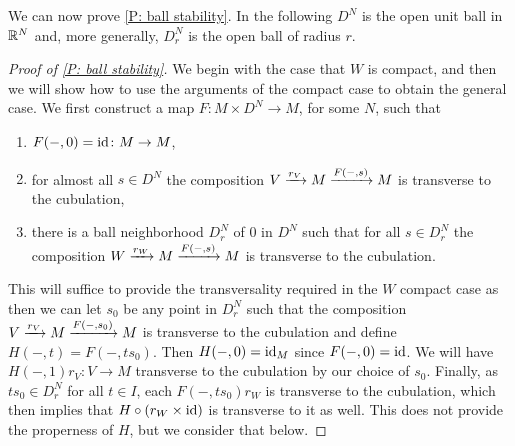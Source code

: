 We can now prove \cref{P: ball stability}.
In the following $D^N$ is the open unit ball in $\mathbb{R}^N$ and, more generally, $D^N_r$ is the open ball of radius $r$.

\begin{proof}[Proof of \cref{P: ball stability}]
	We begin with the case that $W$ is compact, and then we will show how to use the arguments of the compact case to obtain the general case.
	We first construct a map $F \colon M \times D^N \to M$, for some $N$, such that

	\begin{enumerate}
		\item $F(-,0) = \mathrm{id} \colon M \to M$,
		\item for almost all $s \in D^N$ the composition $V \xrightarrow{r_V} M \xrightarrow{F(-,s)}M$ is transverse to the cubulation,
		\item there is a ball neighborhood $D_r^N$ of $0$ in $D^N$ such that for all $s \in D_r^N$ the composition $W \xrightarrow{r_W} M \xrightarrow{F(-,s)}M$ is transverse to the cubulation.
	\end{enumerate}

	This will suffice to provide the transversality required in the $W$ compact case as then we can let $s_0$ be any point in $D_r^N$ such that the composition $V \xrightarrow{r_V} M \xrightarrow{F(-,s_0)}M$ is transverse to the cubulation and define $H(-,t) = F(-,ts_0)$.
	Then $H(-,0) = \mathrm{id}_M$ since $F(-,0) = \mathrm{id}$.
	We will have $H(-,1) r_V \colon V \to M$ transverse to the cubulation by our choice of $s_0$.
	Finally, as $ts_0 \in D_r^N$ for all $t \in I$, each $F(-,ts_0)r_W$ is transverse to the cubulation, which then implies that $H \circ (r_{W} \times \mathrm{id})$ is transverse to it as well.
	This does not provide the properness of $H$, but we consider that below.

\end{proof}
